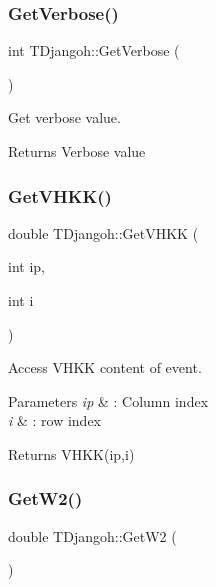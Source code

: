 \subsubsection{\texorpdfstring{Get\+Verbose()}{GetVerbose()}}
{\footnotesize\ttfamily int T\+Djangoh\+::\+Get\+Verbose (\begin{DoxyParamCaption}{ }\end{DoxyParamCaption})}



Get verbose value. 

\begin{DoxyReturn}{Returns}
Verbose value 
\end{DoxyReturn}
\mbox{\label{class_t_djangoh_ab8bbab97c50a6a9f296fbd0d78e98e17}} 
\subsubsection{\texorpdfstring{Get\+V\+H\+K\+K()}{GetVHKK()}}
{\footnotesize\ttfamily double T\+Djangoh\+::\+Get\+V\+H\+KK (\begin{DoxyParamCaption}\item[{int}]{ip,  }\item[{int}]{i }\end{DoxyParamCaption})}



Access V\+H\+KK content of event. 


\begin{DoxyParams}{Parameters}
{\em ip} & \+: Column index \\
\hline
{\em i} & \+: row index \\
\hline
\end{DoxyParams}
\begin{DoxyReturn}{Returns}
V\+H\+K\+K(ip,i) 
\end{DoxyReturn}
\mbox{\label{class_t_djangoh_a94c252e7c5375e9641ad5ea048098c06}} 
\subsubsection{\texorpdfstring{Get\+W2()}{GetW2()}}
{\footnotesize\ttfamily double T\+Djangoh\+::\+Get\+W2 (\begin{DoxyParamCaption}{ }\end{DoxyParamCaption})\hspace{0.3cm}{\ttfamily [inline]}}

